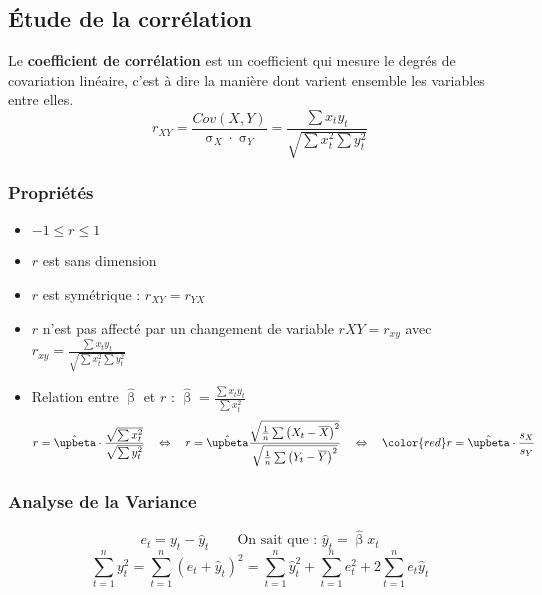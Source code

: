 \documentclass{article}
\newcommand{\hbeta}{\hat{\upbeta}}
\newcommand{\sumt}{\sum\limits_{t=1}^n}
\newcommand{\xb}{\overline{X}}
\newcommand{\yb}{\overline{Y}}
\begin{document}
\subsection{Étude de la corrélation}
 Le \textbf{coefficient de corrélation} est un coefficient qui mesure le degrés de covariation linéaire, c'est à dire la manière dont varient ensemble les variables entre elles.
 \[r_{XY} = \frac{Cov(X,Y)}{\upsigma_X \cdot \upsigma_Y} = \frac{\sum x_t y_t}{\sqrt{\sum x_t^2 \sum y_t^2}}\]
 
 \subsubsection{Propriétés}
 \begin{itemize}
 	\item $-1 \leq r \leq 1$
 	\item $r$ est sans dimension
 	\item $r$ est symétrique : $r_{XY} = r_{YX}$
 	\item $r$ n'est pas affecté par un changement de variable $r{XY} = r_{xy}$ \quad avec $r_{xy} =  \frac{\sum x_t y_t}{\sqrt{\sum x_t^2 \sum y_t^2}}$
 	\item Relation entre $\hbeta$ et $r$ : \quad $\hbeta = \frac{\sum x_t y_t}{\sum x_t^2}$
 	 \[r = \hbeta \cdot \frac{\sqrt{\sum x_t^2}}{\sqrt{\sum y_t^2}} \quad \Leftrightarrow \quad r = \hbeta \frac{\sqrt{\frac{1}{n} \sum \left(X_t - \xb \right)^2}}{\sqrt{\frac{1}{n}\sum \left(Y_t - \yb\right)^2}} \quad \Leftrightarrow \quad {\color{red}r = \hbeta \cdot \frac{s_X}{s_Y}} \]
 \end{itemize}

 \subsubsection{Analyse de la Variance}
 \[e_t = y_t - \hat{y}_t \qquad \textrm{On sait que : } \hat{y}_t = \hbeta x_t\]
 \[\sumt y_t^2 = \sumt \left(e_t + \hat{y}_t\right)^2 = \sumt \hat{y}_t^2 + \sumt e_t^2 + 2 \sumt e_t \hat{y}_t\]
 
\end{document}
